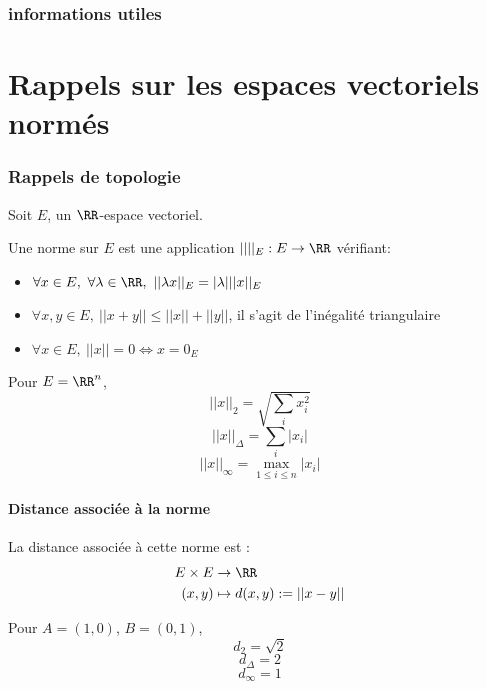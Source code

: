 \documentclass[../main.tex]{subfile}
\begin{document}
\section{informations utiles}
\part{Rappels sur les espaces vectoriels normés}

\section{Rappels de topologie}
Soit $E$, un $\RR$-espace vectoriel.\\
\begin{defi}
	Une norme sur $E$ est une application $|| ||_E: E \to \RR$ vérifiant:
\begin{itemize}	
	\item $\forall x \in E, \ \forall \lambda \in \RR, \ ||\lambda x||_E = |\lambda| ||x||_E$
	\item $\forall x, y \in E, \ $$||x + y|| \leq ||x|| + ||y||$, il s'agit de l'inégalité triangulaire
	\item $\forall x \in E, \ ||x|| = 0 \Leftrightarrow x = 0_E$ 
\end{itemize}
\end{defi}

\begin{ex}
	Pour $E = \RR^n$, \\
	$$||x||_2 = \sqrt{\sum\limits_i x_i^2}$$
	$$||x||_\Delta = \sum\limits_i |x_i|$$
	$$||x||_\infty = \max\limits_{1 \leq i \leq n} |x_i|$$
\end{ex}

\subsection{Distance associée à la norme}
\begin{defi}
	La distance associée à cette norme est :\\
	$$
\begin{aligned}
	E \times E &\to \RR\\
	(x, y) &\mapsto d(x, y) := ||x-y||
\end{aligned}
	$$
\end{defi}

\begin{ex}
	Pour $A = (1, 0)$, $B = (0, 1)$, \\
	$$d_2 = \sqrt{2}$$
	$$d_\Delta = 2$$
	$$d_\infty = 1$$
\end{ex}
\end{document}
